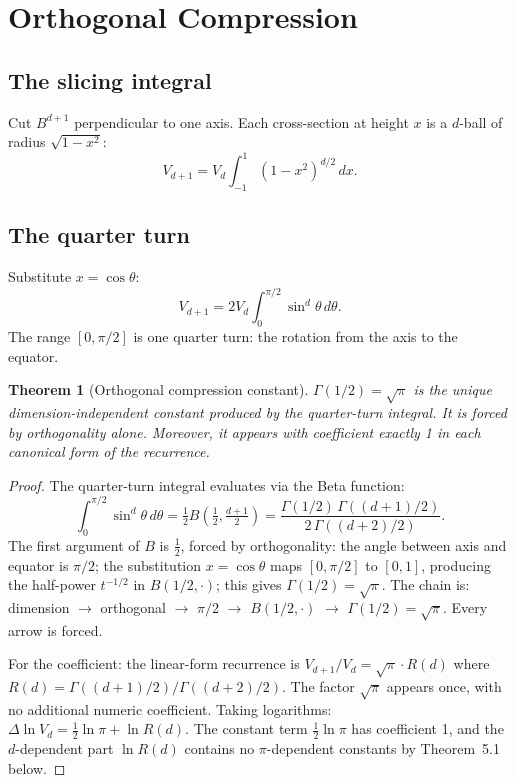 \documentclass[11pt,a4paper]{article}
\newtheorem{theorem}{Theorem}[section]
\begin{document}
\section{Orthogonal Compression}

\subsection{The slicing integral}

Cut $B^{d+1}$ perpendicular to one axis. Each cross-section at height $x$ is a $d$-ball of radius
$\sqrt{1-x^2}$:
\begin{equation}
V_{d+1} = V_d \int_{-1}^{1} (1-x^2)^{d/2}\,dx.
\end{equation}

\subsection{The quarter turn}

Substitute $x = \cos\theta$:
\begin{equation}
V_{d+1} = 2V_d \int_0^{\pi/2} \sin^d\theta\,d\theta.
\end{equation}
The range $[0,\pi/2]$ is one quarter turn: the rotation from the axis to the equator.

\begin{theorem}[Orthogonal compression constant]
$\Gamma(1/2) = \sqrt{\pi}$ is the unique dimension-independent constant produced by the quarter-turn integral. It is forced by orthogonality alone. Moreover, it appears with coefficient exactly 1 in each canonical form of the recurrence.
\end{theorem}

\begin{proof}
The quarter-turn integral evaluates via the Beta function:
\[
\int_0^{\pi/2}\sin^d\theta\,d\theta = \tfrac{1}{2}B\!\left(\tfrac{1}{2},\tfrac{d+1}{2}\right) = \frac{\Gamma(1/2)\,\Gamma((d+1)/2)}{2\,\Gamma((d+2)/2)}.
\]
The first argument of $B$ is $\frac{1}{2}$, forced by orthogonality: the angle between axis and equator
is $\pi/2$; the substitution $x = \cos\theta$ maps $[0,\pi/2]$ to $[0,1]$, producing the half-power $t^{-1/2}$
in $B(1/2,\cdot)$; this gives $\Gamma(1/2) = \sqrt{\pi}$. The chain is: dimension $\to$ orthogonal $\to$ $\pi/2$ $\to$
$B(1/2,\cdot)$ $\to$ $\Gamma(1/2) = \sqrt{\pi}$. Every arrow is forced.

For the coefficient: the linear-form recurrence is $V_{d+1}/V_d = \sqrt{\pi}\cdot R(d)$ where $R(d) = \Gamma((d+1)/2)/\Gamma((d+2)/2)$. The factor $\sqrt{\pi}$ appears once, with no additional numeric coefficient. Taking logarithms: $\Delta\ln V_d = \frac{1}{2}\ln\pi + \ln R(d)$. The constant term $\frac{1}{2}\ln\pi$ has coefficient 1, and the $d$-dependent part $\ln R(d)$ contains no $\pi$-dependent constants by Theorem~5.1 below.
\end{proof}
\end{document}
